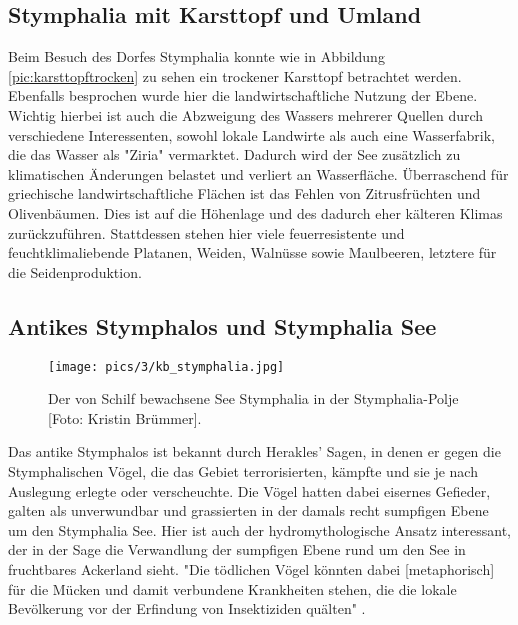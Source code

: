 \documentclass[preprint]{geomorphica} %
\begin{document}
\subsection{Stymphalia mit Karsttopf und Umland}
\label{sec:stymphalia}

Beim Besuch des Dorfes Stymphalia konnte wie in Abbildung \ref{pic:karsttopftrocken} zu sehen ein trockener Karsttopf betrachtet werden. Ebenfalls besprochen wurde hier die landwirtschaftliche Nutzung der Ebene. Wichtig hierbei ist auch die Abzweigung des Wassers mehrerer Quellen durch verschiedene Interessenten, sowohl lokale Landwirte als auch eine Wasserfabrik, die das Wasser als "Ziria" vermarktet. Dadurch wird der See zusätzlich zu klimatischen Änderungen belastet und verliert an Wasserfläche. Überraschend für griechische landwirtschaftliche Flächen ist das Fehlen von Zitrusfrüchten und Olivenbäumen. Dies ist auf die Höhenlage und des dadurch eher kälteren Klimas zurückzuführen. Stattdessen stehen hier viele feuerresistente und feuchtklimaliebende Platanen, Weiden, Walnüsse sowie Maulbeeren, letztere für die Seidenproduktion. 

\subsection{Antikes Stymphalos und Stymphalia See}
\label{sec:stymphalos}

\begin{figure}[h]
    \centering
    \texttt{[image: pics/3/kb\_stymphalia.jpg]}
    \caption{Der von Schilf bewachsene See Stymphalia in der Stymphalia-Polje [Foto: Kristin Brümmer].}
    \label{pic:stymphalia}
\end{figure}

Das antike Stymphalos ist bekannt durch Herakles' Sagen, in denen er gegen die Stymphalischen Vögel, die das Gebiet terrorisierten, kämpfte und sie je nach Auslegung erlegte oder verscheuchte. Die Vögel hatten dabei eisernes Gefieder, galten als unverwundbar und grassierten in der damals recht sumpfigen Ebene um den Stymphalia See. Hier ist auch der hydromythologische Ansatz interessant, der in der Sage die Verwandlung der sumpfigen Ebene rund um den See in fruchtbares Ackerland sieht. "Die tödlichen Vögel könnten dabei [metaphorisch] für die Mücken und damit verbundene Krankheiten stehen, die die lokale Bevölkerung vor der Erfindung von Insektiziden quälten" \cite{unkelHydraHermesHerkules2020}. 
\end{document}
